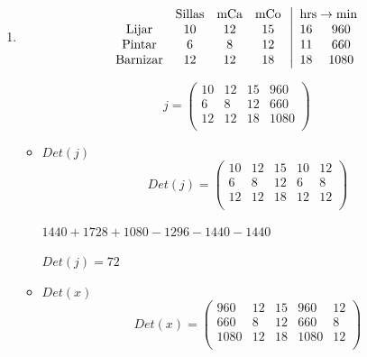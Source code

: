 \documentclass[11pt,a4paper]{article}
\begin{document}
\begin{enumerate}
\begin{itemize}
\item No hay solución: $\beta = 2\alpha-1$, $\alpha\neq1$
\end{itemize}

\item

$$
\begin{array}{cccc}
     &\text{Sillas}&\text{mCa}&\text{mCo}  \\
     \text{Lijar}&10&12&15\\
     \text{Pintar}&6&8&12\\
     \text{Barnizar}&12&12&18\\
\end{array}
\left|
\begin{array}{cc}
     \multicolumn{2}{c}{\text{hrs}\rightarrow\text{min}}\\
     16&960\\
     11&660\\
    18&1080\\
\end{array}
\right.
$$

$$
j=
\left(\begin{array}{ccc|c}  
 10 & 12 & 15 & 960 \\  
 6 & 8 & 12 & 660  \\ 
 12 & 12 & 18 & 1080  \\ 
\end{array}\right)
$$

\begin{itemize}
\item $Det(j)$
$$
Det(j)= 
\left(\begin{array}{ccc|cc}  
 10 & 12 & 15 & 10 & 12 \\  
 6 & 8 & 12 & 6 & 8 \\ 
 12 & 12 & 18 & 12 & 12 \\ 
\end{array}\right)
$$

\begin{center}
    $1440+1728+1080-1296-1440-1440$
    
    $Det(j)= 72$
\end{center}

\end{itemize}


\begin{itemize}
\item $Det(x)$
$$
Det(x)= 
\left(\begin{array}{ccc|cc}  
 960 & 12 & 15 & 960 & 12 \\  
 660 & 8 & 12 & 660 & 8 \\ 
 1080 & 12 & 18 & 1080 & 12 \\ 
\end{array}\right)
$$


\end{itemize}
\end{enumerate}
\end{document}
